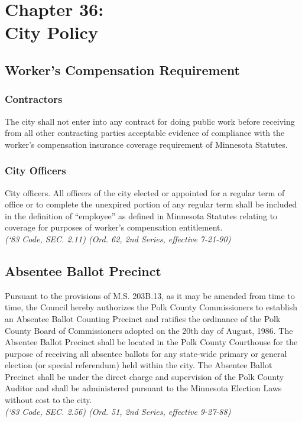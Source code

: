 \chapter*{Chapter 36: \\
	City Policy}
    \minitoc
    \pagebreak
    
\section{Worker's Compensation Requirement}
\subsection{Contractors}
The city shall not enter into any contract for doing public work before receiving from all other contracting parties acceptable evidence of compliance with the worker’s compensation insurance coverage requirement of Minnesota Statutes.
\subsection{City Officers}
City officers.  All officers of the city elected or appointed for a regular term of office or to complete the unexpired portion of any regular term shall be included in the definition of “employee” as defined in Minnesota Statutes relating to coverage for purposes of worker’s compensation entitlement.\\
\emph{(‘83 Code, SEC. 2.11)  (Ord. 62, 2nd Series, effective 7-21-90)}

\section{Absentee Ballot Precinct}
Pursuant to the provisions of M.S. \textsection 203B.13, as it may be amended from time to time, the Council hereby authorizes the Polk County Commissioners to establish an Absentee Ballot Counting Precinct and ratifies the ordinance of the Polk County Board of Commissioners adopted on the 20th day of August, 1986.  The Absentee Ballot Precinct shall be located in the Polk County Courthouse for the purpose of receiving all absentee ballots for any state-wide primary or general election (or special referendum) held within the city.  The Absentee Ballot Precinct shall be under the direct charge and supervision of the Polk County Auditor and shall be administered pursuant to the Minnesota Election Laws without cost to the city.\\
\emph{(‘83 Code, SEC. 2.56)  (Ord. 51, 2nd Series, effective 9-27-88)}

